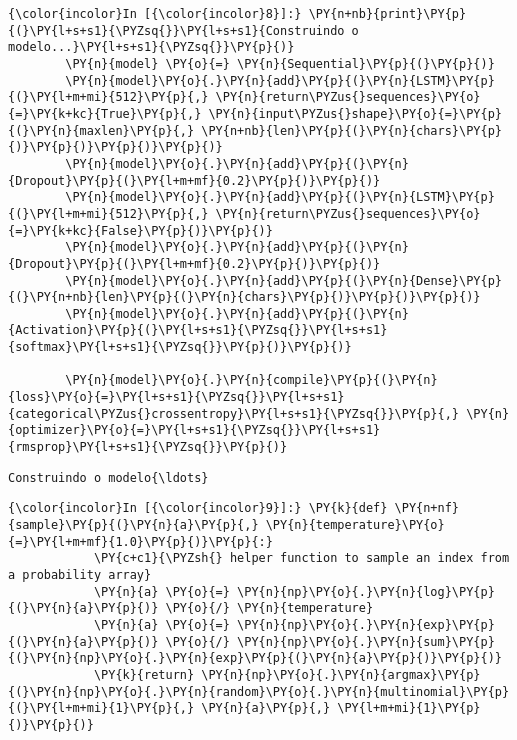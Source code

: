     \begin{Verbatim}[commandchars=\\\{\}]
{\color{incolor}In [{\color{incolor}8}]:} \PY{n+nb}{print}\PY{p}{(}\PY{l+s+s1}{\PYZsq{}}\PY{l+s+s1}{Construindo o modelo...}\PY{l+s+s1}{\PYZsq{}}\PY{p}{)}
        \PY{n}{model} \PY{o}{=} \PY{n}{Sequential}\PY{p}{(}\PY{p}{)}
        \PY{n}{model}\PY{o}{.}\PY{n}{add}\PY{p}{(}\PY{n}{LSTM}\PY{p}{(}\PY{l+m+mi}{512}\PY{p}{,} \PY{n}{return\PYZus{}sequences}\PY{o}{=}\PY{k+kc}{True}\PY{p}{,} \PY{n}{input\PYZus{}shape}\PY{o}{=}\PY{p}{(}\PY{n}{maxlen}\PY{p}{,} \PY{n+nb}{len}\PY{p}{(}\PY{n}{chars}\PY{p}{)}\PY{p}{)}\PY{p}{)}\PY{p}{)}
        \PY{n}{model}\PY{o}{.}\PY{n}{add}\PY{p}{(}\PY{n}{Dropout}\PY{p}{(}\PY{l+m+mf}{0.2}\PY{p}{)}\PY{p}{)}
        \PY{n}{model}\PY{o}{.}\PY{n}{add}\PY{p}{(}\PY{n}{LSTM}\PY{p}{(}\PY{l+m+mi}{512}\PY{p}{,} \PY{n}{return\PYZus{}sequences}\PY{o}{=}\PY{k+kc}{False}\PY{p}{)}\PY{p}{)}
        \PY{n}{model}\PY{o}{.}\PY{n}{add}\PY{p}{(}\PY{n}{Dropout}\PY{p}{(}\PY{l+m+mf}{0.2}\PY{p}{)}\PY{p}{)}
        \PY{n}{model}\PY{o}{.}\PY{n}{add}\PY{p}{(}\PY{n}{Dense}\PY{p}{(}\PY{n+nb}{len}\PY{p}{(}\PY{n}{chars}\PY{p}{)}\PY{p}{)}\PY{p}{)}
        \PY{n}{model}\PY{o}{.}\PY{n}{add}\PY{p}{(}\PY{n}{Activation}\PY{p}{(}\PY{l+s+s1}{\PYZsq{}}\PY{l+s+s1}{softmax}\PY{l+s+s1}{\PYZsq{}}\PY{p}{)}\PY{p}{)}
        
        \PY{n}{model}\PY{o}{.}\PY{n}{compile}\PY{p}{(}\PY{n}{loss}\PY{o}{=}\PY{l+s+s1}{\PYZsq{}}\PY{l+s+s1}{categorical\PYZus{}crossentropy}\PY{l+s+s1}{\PYZsq{}}\PY{p}{,} \PY{n}{optimizer}\PY{o}{=}\PY{l+s+s1}{\PYZsq{}}\PY{l+s+s1}{rmsprop}\PY{l+s+s1}{\PYZsq{}}\PY{p}{)}
\end{Verbatim}

    \begin{Verbatim}[commandchars=\\\{\}]
Construindo o modelo{\ldots}

    \end{Verbatim}

    \begin{Verbatim}[commandchars=\\\{\}]
{\color{incolor}In [{\color{incolor}9}]:} \PY{k}{def} \PY{n+nf}{sample}\PY{p}{(}\PY{n}{a}\PY{p}{,} \PY{n}{temperature}\PY{o}{=}\PY{l+m+mf}{1.0}\PY{p}{)}\PY{p}{:}
            \PY{c+c1}{\PYZsh{} helper function to sample an index from a probability array}
            \PY{n}{a} \PY{o}{=} \PY{n}{np}\PY{o}{.}\PY{n}{log}\PY{p}{(}\PY{n}{a}\PY{p}{)} \PY{o}{/} \PY{n}{temperature}
            \PY{n}{a} \PY{o}{=} \PY{n}{np}\PY{o}{.}\PY{n}{exp}\PY{p}{(}\PY{n}{a}\PY{p}{)} \PY{o}{/} \PY{n}{np}\PY{o}{.}\PY{n}{sum}\PY{p}{(}\PY{n}{np}\PY{o}{.}\PY{n}{exp}\PY{p}{(}\PY{n}{a}\PY{p}{)}\PY{p}{)}
            \PY{k}{return} \PY{n}{np}\PY{o}{.}\PY{n}{argmax}\PY{p}{(}\PY{n}{np}\PY{o}{.}\PY{n}{random}\PY{o}{.}\PY{n}{multinomial}\PY{p}{(}\PY{l+m+mi}{1}\PY{p}{,} \PY{n}{a}\PY{p}{,} \PY{l+m+mi}{1}\PY{p}{)}\PY{p}{)}
\end{Verbatim}

